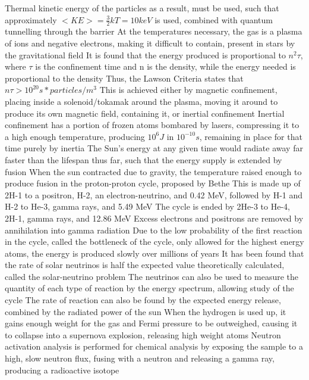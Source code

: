 \documentclass[11 pt, twoside]{article}
\newenvironment{outline*}
{
	\begin{outline}[enumerate]
	}
	{\end{outline}
}
\begin{document}
\begin{outline*}
		\3 Thermal kinetic energy of the particles as a result, must be used, such that approximately $<KE> = \frac{3}{2}kT = 10 keV$ is used, combined with quantum tunnelling through the barrier
			\4 At the temperatures necessary, the gas is a plasma of ions and negative electrons, making it difficult to contain, present in stars by the gravitational field
			\4 It is found that the energy produced is proportional to $n^2\tau$, where $\tau$ is the confinement time and n is the density, while the energy needed is proportional to the density
			\4 Thus, the Lawson Criteria states that $n\tau > 10^{20} s * particles/m^3$
		\3 This is achieved either by magnetic confinement, placing inside a solenoid/tokamak around the plasma, moving it around to produce its own magnetic field, containing it, or inertial confinement
			\4 Inertial confinement has a portion of frozen atoms bombared by lasers, compressing it to a high enough temperature, producing $10^6 J$ in $10^{-10} s$, remaining in place for that time purely by inertia
	\2 The Sun's energy at any given time would radiate away far faster than the lifespan thus far, such that the energy supply is extended by fusion
		\3 When the sun contracted due to gravity, the temperature raised enough to produce fusion in the proton-proton cycle, proposed by Bethe
			\4 This is made up of 2H-1 to a positron, H-2, an electron-neutrino, and 0.42 MeV, followed by H-1 and H-2 to He-3, gamma rays, and 5.49 MeV
			\4 The cycle is ended by 2He-3 to He-4, 2H-1, gamma rays, and 12.86 MeV
			\4 Excess electrons and positrons are removed by annihilation into gamma radiation
		\3 Due to the low probability of the first reaction in the cycle, called the bottleneck of the cycle, only allowed for the highest energy atoms, the energy is produced slowly over millions of years
		\3 It has been found that the rate of solar neutrinos is half the expected value theoretically calculated, called the solar-neutrino problem
			\4 The neutrinos can also be used to measure the quantity of each type of reaction by the energy spectrum, allowing study of the cycle
		\3 The rate of reaction can also be found by the expected energy release, combined by the radiated power of the sun
		\3 When the hydrogen is used up, it gains enough weight for the gas and Fermi pressure to be outweighed, causing it to collapse into a supernova explosion, releasing high weight atoms
\1 Neutron activation analysis is performed for chemical analysis by exposing the sample to a high, slow neutron flux, fusing with a neutron and releasing a gamma ray, producing a radioactive isotope

\end{outline*}
\end{document}
